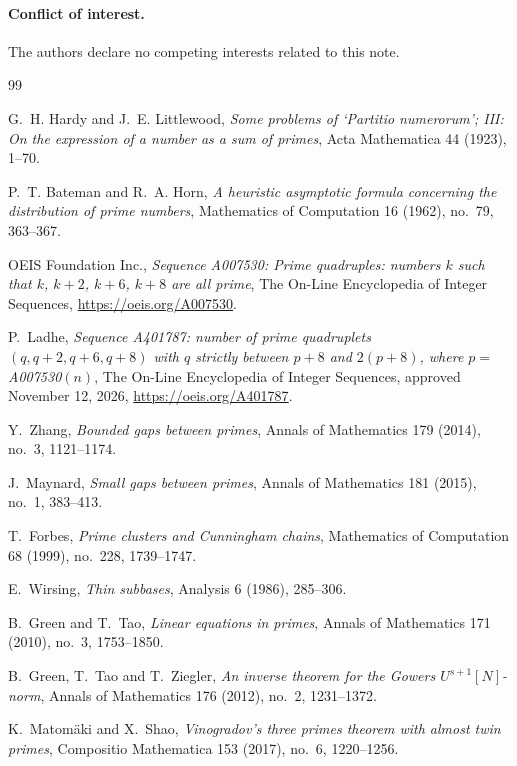 \documentclass[11pt,a4paper]{article}
\begin{document}
\paragraph{Conflict of interest.}
The authors declare no competing interests related to this note.

\begin{thebibliography}{99}

G.~H. Hardy and J.~E. Littlewood,
\emph{Some problems of `Partitio numerorum'; III: On the expression of a
number as a sum of primes},
Acta Mathematica 44 (1923), 1--70.

P.~T. Bateman and R.~A. Horn,
\emph{A heuristic asymptotic formula concerning the distribution of prime
numbers},
Mathematics of Computation 16 (1962), no.~79, 363--367.

OEIS Foundation Inc.,
\emph{Sequence A007530: Prime quadruples: numbers $k$ such that $k$, $k+2$,
$k+6$, $k+8$ are all prime},
The On-Line Encyclopedia of Integer Sequences,
\url{https://oeis.org/A007530}.

P.~Ladhe,
\emph{Sequence A401787: number of prime quadruplets $(q,q+2,q+6,q+8)$ with
$q$ strictly between $p+8$ and $2(p+8)$, where $p=$ A007530$(n)$},
The On-Line Encyclopedia of Integer Sequences, approved November 12, 2026,
\url{https://oeis.org/A401787}.

Y.~Zhang,
\emph{Bounded gaps between primes},
Annals of Mathematics 179 (2014), no.~3, 1121--1174.

J.~Maynard,
\emph{Small gaps between primes},
Annals of Mathematics 181 (2015), no.~1, 383--413.

T.~Forbes,
\emph{Prime clusters and Cunningham chains},
Mathematics of Computation 68 (1999), no.~228, 1739--1747.

E.~Wirsing,
\emph{Thin subbases},
Analysis 6 (1986), 285--306.

B.~Green and T.~Tao,
\emph{Linear equations in primes},
Annals of Mathematics 171 (2010), no.~3, 1753--1850.

B.~Green, T.~Tao and T.~Ziegler,
\emph{An inverse theorem for the Gowers $U^{s+1}[N]$-norm},
Annals of Mathematics 176 (2012), no.~2, 1231--1372.

K.~Matom\"aki and X.~Shao,
\emph{Vinogradov's three primes theorem with almost twin primes},
Compositio Mathematica 153 (2017), no.~6, 1220--1256.


\end{thebibliography}
\end{document}
